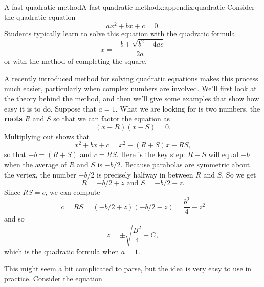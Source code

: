 \documentclass[oneside,10pt,]{book}
\newcommand{\terminology}[1]{\textbf{#1}}
\numberwithin{equation}{section}
\numberwithin{equation}{section}
\begin{document}
%
%
%
%
\typeout{************************************************}
\typeout{************************************************}
%
%
\appendix
%
\begin{appendixptx}{A fast quadratic method}{}{A fast quadratic method}{}{}{x:appendix:quadratic}
Consider the quadratic equation%
\begin{equation*}
ax^2 + bx + c = 0.
\end{equation*}
Students typically learn to solve this equation with the quadratic formula%
\begin{equation*}
x = \frac{-b \pm \sqrt{b^2 - 4ac}}{2a}
\end{equation*}
or with the method of completing the square.%
\par
A recently introduced method for solving quadratic equations makes this process much easier, particularly when complex numbers are involved. We'll first look at the theory behind the method, and then we'll give some examples that show how easy it is to do. Suppose that \(a = 1\). What we are looking for is two numbers, the \terminology{roots} \(R\) and \(S\) so that we can factor the equation as%
\begin{equation*}
(x - R)(x - S) = 0.
\end{equation*}
Multiplying out shows that%
\begin{equation*}
x^2 + bx + c = x^2 -(R +S)x + RS,
\end{equation*}
so that \(-b = (R + S)\) and \(c = RS\). Here is the key step: \(R+S\) will equal \(-b\) when the average of \(R\) and \(S\) is \(-b/2\). Because parabolas are symmetric about the vertex, the number \(-b/2\) is precisely halfway in between \(R\) and \(S\). So we get%
\begin{equation*}
R = -b/2 + z \text{ and } S = -b/2 - z.
\end{equation*}
Since \(RS = c\), we can compute%
\begin{equation*}
c = RS = (-b/2 + z)(-b/2 - z) = \frac{b^2}{4} - z^2
\end{equation*}
and so%
\begin{equation*}
z = \pm\sqrt{\frac{B^2}{4} - C},
\end{equation*}
which is the quadratic formula when \(a = 1\).%
\par
This might seem a bit complicated to parse, but the idea is very easy to use in practice. Consider the equation%

\end{appendixptx}
\end{document}
